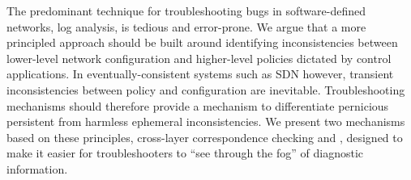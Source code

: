 The predominant technique for troubleshooting bugs in software-defined networks,
log analysis, is tedious and error-prone. We argue that a more principled
approach should be built around identifying inconsistencies between lower-level network configuration
and higher-level policies dictated by control applications. In
eventually-consistent systems such as SDN however,
transient inconsistencies between policy and configuration are inevitable.
Troubleshooting mechanisms should therefore provide a mechanism to differentiate
pernicious persistent from harmless ephemeral inconsistencies. We present two
mechanisms based on these principles, cross-layer correspondence checking and \simulator,
designed to make it easier for troubleshooters to ``see through the fog'' of
diagnostic information.
